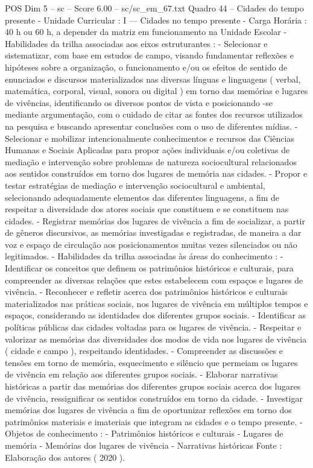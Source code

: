 \begin{textsample}{POS Dim 5 – sc – Score 6.00 – sc/sc\_em\_67.txt}
Quadro 44 – Cidades do tempo presente - Unidade Curricular : I — Cidades no tempo presente - Carga Horária : 40 h ou 60 h, a depender da matriz em funcionamento na Unidade Escolar - Habilidades da trilha associadas aos eixos estruturantes : - Selecionar e sistematizar, com base em estudos de campo, visando fundamentar reflexões e hipóteses sobre a organização, o funcionamento e/ou os efeitos de sentido de enunciados e discursos materializados nas diversas línguas e linguagens ( verbal, matemática, corporal, visual, sonora ou digital ) em torno das memórias e lugares de vivências, identificando os diversos pontos de vista e posicionando -se mediante argumentação, com o cuidado de citar as fontes dos recursos utilizados na pesquisa e buscando apresentar conclusões com o uso de diferentes mídias. - Selecionar e mobilizar intencionalmente conhecimentos e recursos das Ciências Humanas e Sociais Aplicadas para propor ações individuais e/ou coletivas de mediação e intervenção sobre problemas de natureza sociocultural relacionados aos sentidos construídos em torno dos lugares de memória nas cidades. - Propor e testar estratégias de mediação e intervenção sociocultural e ambiental, selecionando adequadamente elementos das diferentes linguagens, a fim de respeitar a diversidade dos atores sociais que constituem e se constituem nas cidades. - Registrar memórias dos lugares de vivência a fim de socializar, a partir de gêneros discursivos, as memórias investigadas e registradas, de maneira a dar voz e espaço de circulação aos posicionamentos muitas vezes silenciados ou não legitimados. - Habilidades da trilha associadas às áreas do conhecimento : - Identificar os conceitos que definem os patrimônios históricos e culturais, para compreender as diversas relações que estes estabelecem com espaços e lugares de vivência. - Reconhecer e refletir acerca dos patrimônios históricos e culturais materializados nas práticas sociais, nos lugares de vivência em múltiplos tempos e espaços, considerando as identidades dos diferentes grupos sociais. - Identificar as políticas públicas das cidades voltadas para os lugares de vivência. - Respeitar e valorizar as memórias das diversidades dos modos de vida nos lugares de vivência ( cidade e campo ), respeitando identidades. - Compreender as discussões e tensões em torno de memória, esquecimento e silêncio que permeiam os lugares de vivência em relação aos diferentes grupos sociais. - Elaborar narrativas históricas a partir das memórias dos diferentes grupos sociais acerca dos lugares de vivência, ressignificar os sentidos construídos em torno da cidade. - Investigar memórias dos lugares de vivência a fim de oportunizar reflexões em torno dos patrimônios materiais e imateriais que integram as cidades e o tempo presente. - Objetos de conhecimento : - Patrimônios históricos e culturais - Lugares de memória - Memórias dos lugares de vivência - Narrativas históricas Fonte : Elaboração dos autores ( 2020 ).

\end{textsample}
